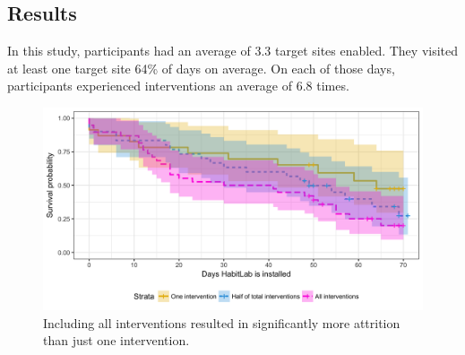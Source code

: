 \subsection{Results}

In this study, participants had an average of 3.3 target sites enabled. They visited at least one target site 64\% of days on average. On each of those days, participants experienced interventions an average of 6.8 times.


\begin{figure}[tb]
\centering
	\includegraphics[width=1.0\textwidth]{figures/attrition_between_subjects.png}
	\caption{Including all interventions resulted in significantly more attrition than just one intervention.}
\label{fig:attrition_between_subjects}
\end{figure}

